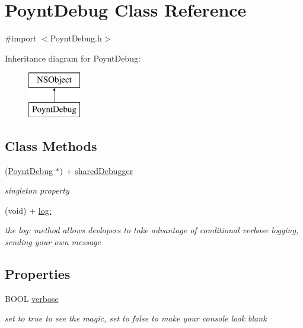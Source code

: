 \hypertarget{interface_poynt_debug}{}\section{Poynt\+Debug Class Reference}
\label{interface_poynt_debug}


{\ttfamily \#import $<$Poynt\+Debug.\+h$>$}

Inheritance diagram for Poynt\+Debug\+:\begin{figure}[H]
\begin{center}
\leavevmode
\includegraphics[height=2.000000cm]{interface_poynt_debug}
\end{center}
\end{figure}
\subsection*{Class Methods}
\begin{DoxyCompactItemize}
\item 
(\hyperlink{interface_poynt_debug}{Poynt\+Debug} $\ast$) + \hyperlink{interface_poynt_debug_a4dfaa75fbad98c4583833b43e18c0bbb}{shared\+Debugger}
\begin{DoxyCompactList}\small\item\em singleton property \end{DoxyCompactList}\item 
(void) + \hyperlink{interface_poynt_debug_a7a02ec4b1915a579185b23cc7d2e6b40}{log\+:}
\begin{DoxyCompactList}\small\item\em the log\+: method allows devlopers to take advantage of conditional verbose logging, sending your own message \end{DoxyCompactList}\end{DoxyCompactItemize}
\subsection*{Properties}
\begin{DoxyCompactItemize}
\item 
B\+O\+OL \hyperlink{interface_poynt_debug_ad023bbf13e60f8caee82c26f70e0f0a5}{verbose}
\begin{DoxyCompactList}\small\item\em set to true to see the magic, set to false to make your console look blank \end{DoxyCompactList}\end{DoxyCompactItemize}


